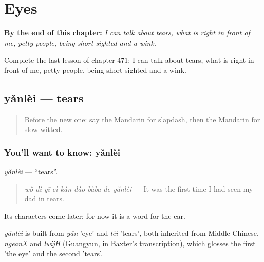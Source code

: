 
\chapter{Eyes}
\label{ch:zh-eyes}

\begin{chapteropening}
\textbf{By the end of this chapter:} \emph{I can talk about tears, what is right in front of me, petty people, being short-sighted and a wink.}

Complete the last lesson of chapter 471: I can talk about tears, what is right in front of me, petty people, being short-sighted and a wink.
\end{chapteropening}

\section[yǎnlèi]{yǎnlèi — tears}

\label{lesson:ZH-C471-yanlei}



\begin{quote}
Before the new one: say the Mandarin for slapdash, then the Mandarin for slow-witted.
\end{quote}

\subsection*{You'll want to know: yǎnlèi}
\emph{yǎnlèi} — \textquotedblleft{}tears\textquotedblright{}.

\begin{quote}
\emph{wǒ dì-yī cì kàn dào bàba de yǎnlèi} — It was the first time I had seen my dad in tears.
\end{quote}

Its characters come later; for now it is a word for the ear.

\begin{cousinweb}
\emph{yǎnlèi} is built from \emph{yǎn} 'eye' and \emph{lèi} 'tears', both inherited from Middle Chinese, \emph{ngeanX} and \emph{lwijH} (Guangyun, in Baxter's transcription), which glosses the first 'the eye' and the second 'tears'.
\end{cousinweb}

